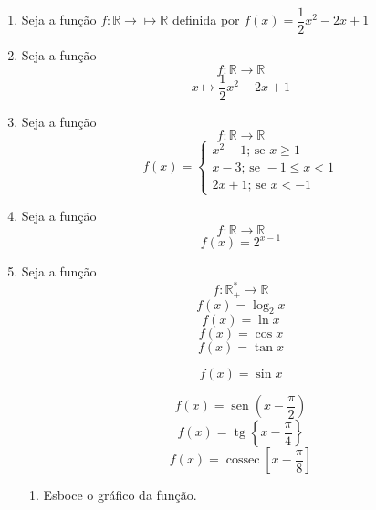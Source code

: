 \documentclass[a4paper,12pt]{article}
\DeclareMathOperator{\sen}{sen}
\DeclareMathOperator{\cossec}{cossec}
\DeclareMathOperator{\tg}{tg}
\begin{document}
\begin{enumerate}
\item Seja a função $f: \mathbb{R} \to \mapsto \mathbb{R}$ definida por $f(x)= \dfrac{1}{2}x^2 - 2x + 1$

\item Seja a função $$f: \mathbb{R} \to \mathbb{R}$$
 $$x \mapsto \dfrac{1}{2}x^2 - 2x + 1$$
\item Seja a função $$f: \mathbb{R} \to \mathbb{R}$$
$$f(x)=
\begin{cases}
	x^2 - 1; \, \textrm{se } x \geq 1 \\
	x - 3; \, \textrm{se } -1 \leq x<1 \\
	2x+1; \, \textrm{se } x < -1
\end{cases}
$$
\item Seja a função $$f: \mathbb{R} \to \mathbb{R}$$
$$f(x)=2^{x-1}$$
\item Seja a função $$f: \mathbb{R}^*_+ \to \mathbb{R}$$
$$f(x)= \log_2 x$$
$$f(x)= \ln x$$
$$f(x)= \cos x$$
$$f(x)= \tan x$$
\begin{comment}
Exemplo da notação original de seno
\end{comment}
$$f(x)= \sin x$$
\begin{comment}
Exemplo da notação de seno com o jeitinho brasileiro
\end{comment}
$$f(x)= \sen \left(x - \frac{\pi}{2} \right)$$
$$f(x)= \tg \left\{x - \frac{\pi}{4} \right\}$$
$$f(x)= \cossec \left[x - \frac{\pi}{8} \right]$$
	\begin{enumerate}
		\item Esboce o gráfico da função.
	\end{enumerate}
\end{enumerate}
\end{document}
